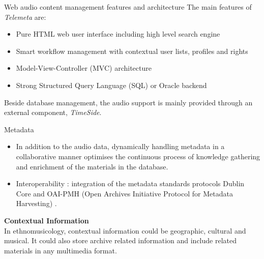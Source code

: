 \documentclass[final, hyperref, table]{beamer}
\begin{document}
\begin{frame}[containsverbatim]{}
\begin{columns}[T]
\begin{column}[T]{.49\linewidth}
\begin{block}{Web audio content management features and architecture}
        The main features of \emph{Telemeta} are:
\vspace{-0.5cm}
\begin{multicols}{2}[]
        
        \begin{itemize}
        \item \alert{Pure HTML} web user interface including high level \alert{search engine}
        \item \alert{Smart workflow management} with contextual user lists, profiles and rights
        \item Model-View-Controller (\alert{MVC}) architecture 
        \item Strong Structured Query Language (\alert{SQL}) or Oracle backend
        \end{itemize}
\end{multicols}
        Beside database management, the audio support is mainly provided through an external component, \emph{TimeSide}.
        
      \end{block}
      \begin{block}{Metadata}
        \vspace{-0.5cm}
        \begin{itemize}
        \item In addition to the audio data, dynamically handling metadata in a \alert{collaborative} manner optimises
          the continuous process of knowledge gathering and enrichment of
          the materials in the database.
        \item Interoperability : integration of the metadata standards protocols \alert{Dublin Core}
          and \alert{OAI-PMH} (Open Archives Initiative Protocol for Metadata
          Harvesting) \cite{DublinCore,OAI-PMH}.
        \end{itemize}
        
        \textbf{Contextual Information}\\
        In ethnomusicology, contextual information could be geographic, cultural and musical. It could also store archive related information and include related materials in any multimedia format. 
        

\end{block}
\end{column}
\end{columns}
\end{frame}
\end{document}
